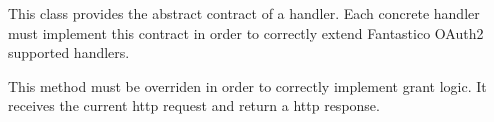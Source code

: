 \documentclass[letterpaper,10pt,english]{sphinxmanual}
\begin{document}
\begin{fulllineitems}
\label{features/oauth2/technical_summary:fantastico.oauth2.grant_handler.GrantHandler}
This class provides the abstract contract of a handler. Each concrete handler must implement this contract in order to
correctly extend Fantastico OAuth2 supported handlers.

\begin{fulllineitems}
\label{features/oauth2/technical_summary:fantastico.oauth2.grant_handler.GrantHandler.handle_grant}
This method must be overriden in order to correctly implement grant logic. It receives the current http request
and return a http response.

\end{fulllineitems}


\end{fulllineitems}

\end{document}
